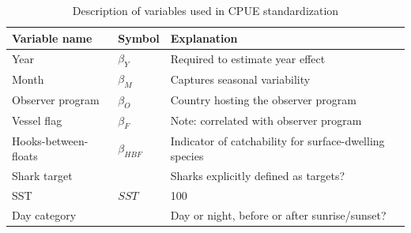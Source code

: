 \documentclass[12pt]{SCreport}
\begin{document}
\begin{table}[!h]
\caption{Description of variables used in CPUE standardization \label{tbl:glm-vars}}
\begin{center}
\begin{tabular}{l|l|p{7cm}}
Variable name & Symbol & Explanation \\
\hline
\hline
Year & $\beta_Y$ & Required to estimate year effect\\
Month & $\beta_M$ & Captures seasonal variability\\
Observer program & $\beta_O$ & Country hosting the observer program\\
Vessel flag & $\beta_F$ & Note: correlated with observer program\\
Hooks-between-floats& $\beta_{HBF}$ & Indicator of catchability for surface-dwelling species\\
Shark target&&Sharks explicitly defined as targets?\\
SST & $SST$ & 100\\
Day category && Day or night, before or after sunrise/sunset?\\

\end{tabular}
\end{center}
\end{table}
\end{document}
